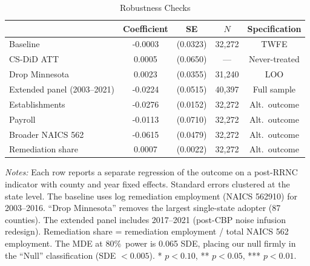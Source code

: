 \begin{table}[htbp]
\centering
\caption{Robustness Checks}
\label{tab:robust}
\begin{tabular}{lcccc}
\hline\hline
 & Coefficient & SE & $N$ & Specification \\
\hline
Baseline & -0.0003 & (0.0323) & 32,272 & TWFE \\
CS-DiD ATT & 0.0005 & (0.0650) & --- & Never-treated \\
Drop Minnesota & 0.0023 & (0.0355) & 31,240 & LOO \\
Extended panel (2003--2021) & -0.0224 & (0.0515) & 40,397 & Full sample \\
Establishments & -0.0276 & (0.0152) & 32,272 & Alt.~outcome \\
Payroll & -0.0113 & (0.0710) & 32,272 & Alt.~outcome \\
Broader NAICS 562 & -0.0615 & (0.0479) & 32,272 & Alt.~outcome \\
Remediation share & 0.0007 & (0.0022) & 32,272 & Alt.~outcome \\
\hline\hline
\end{tabular}
\begin{tablenotes}[flushleft]
\small
\item \textit{Notes:} Each row reports a separate regression of the outcome on a post-RRNC indicator with county and year fixed effects. Standard errors clustered at the state level. The baseline uses log remediation employment (NAICS 562910) for 2003--2016. ``Drop Minnesota'' removes the largest single-state adopter (87 counties). The extended panel includes 2017--2021 (post-CBP noise infusion redesign). Remediation share = remediation employment / total NAICS 562 employment. The MDE at 80\%\ power is 0.065 SDE, placing our null firmly in the ``Null'' classification (SDE $< 0.005$). * $p<0.10$, ** $p<0.05$, *** $p<0.01$.
\end{tablenotes}
\end{table}

